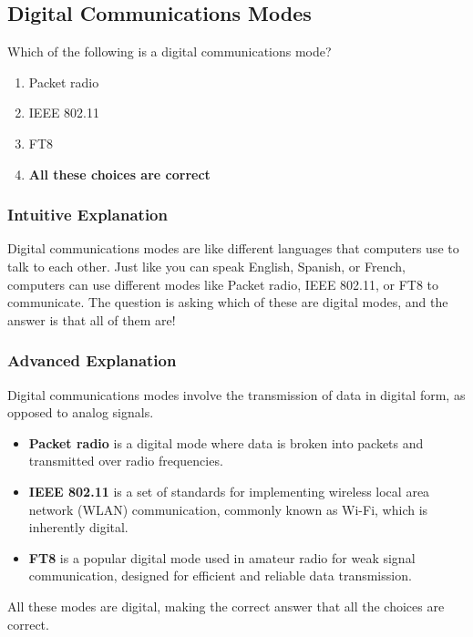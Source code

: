 \subsection{Digital Communications Modes}
\label{T8D01}

\begin{tcolorbox}[colback=gray!10!white,colframe=black!75!black,title=T8D01]
Which of the following is a digital communications mode?
\begin{enumerate}[noitemsep]
    \item Packet radio
    \item IEEE 802.11
    \item FT8
    \item \textbf{All these choices are correct}
\end{enumerate}
\end{tcolorbox}

\subsubsection*{Intuitive Explanation}
Digital communications modes are like different languages that computers use to talk to each other. Just like you can speak English, Spanish, or French, computers can use different modes like Packet radio, IEEE 802.11, or FT8 to communicate. The question is asking which of these are digital modes, and the answer is that all of them are!

\subsubsection*{Advanced Explanation}
Digital communications modes involve the transmission of data in digital form, as opposed to analog signals. 

\begin{itemize}
    \item \textbf{Packet radio} is a digital mode where data is broken into packets and transmitted over radio frequencies.
    \item \textbf{IEEE 802.11} is a set of standards for implementing wireless local area network (WLAN) communication, commonly known as Wi-Fi, which is inherently digital.
    \item \textbf{FT8} is a popular digital mode used in amateur radio for weak signal communication, designed for efficient and reliable data transmission.
\end{itemize}

All these modes are digital, making the correct answer that all the choices are correct.